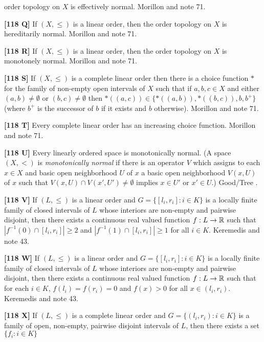 order topology on $X$ is effectively normal.  \ac{Morillon} \cite{1988}
and note 71.
\smallskip
\item{}{\bf [118 Q]} If $(X,\le)$ is a linear order, then the order
topology on $X$ is hereditarily normal.  \ac{Morillon} \cite{1988} and
note 71.
\smallskip
\item{}{\bf [118 R]} If $(X,\le)$ is a linear order, then the order
topology on $X$ is monotonely normal.  \ac{Morillon} \cite{1987} and
note 71.
\smallskip
\item{}{\bf [118 S]} If $(X,\le)$ is a complete linear order then there is
a choice function $*$ for the family of non-empty open intervals of $X$
such that if $a,b,c\in X$ and either $(a,b)\ne \emptyset$ or
$(b,c)\ne \emptyset$ then $*((a,c)) \in \{ *((a,b)), *((b,c)), b,b^+\}$
(where $b^+$ is the successor of $b$ if it exists and $b$
otherwise).  \ac{Morillon} \cite{1987} and note 71.
\smallskip
\item{}{\bf [118 T]} Every complete linear order has an increasing choice
function.  \ac{Morillon} \cite{1987} and note 71.
\smallskip
\item{}{\bf [118 U]} Every linearly ordered space is monotonically normal.
(A space $(X,<)$ is {\it monotonically normal} if there is an operator
$V$ which assigns to each $x\in X$ and basic open neighborhood $U$ of $x$
a basic open neighborhood $V(x,U)$ of $x$ such that $V(x,U)\cap V(x',U')
\ne\emptyset$ implies $x\in U'$ or $x'\in U$.) \ac{Good/Tree} \cite{1995}.
\smallskip
\item{}{\bf [118 V]} If $(L,\le)$ is a linear order and $G=\{[l_i,r_i]:
i\in K\}$ is a locally finite family of closed intervals of $L$ whose
interiors are non-empty and pairwise disjoint, then there exists a
continuous real valued function $f: L\to \Bbb R$ such that $|f^{-1}(0)
\cap[l_i,r_i]|\ge 2$ and $|f^{-1}(1)\cap[l_i,r_i]|\ge 1$ for all $i\in K$.
\ac{Keremedis} \cite{1997} and note 43.
\smallskip
\item{}{\bf [118 W]} If $(L,\le)$ is a linear order and $G=\{[l_i,r_i]:
i\in K\}$ is a locally finite family of closed intervals of $L$ whose
interiors are non-empty and pairwise disjoint, then there exists a
continuous real valued function $f: L\to \Bbb R$ such that for each
$i\in K$, $f(l_i) = f(r_i) = 0$ and $f(x) > 0$ for all $x\in (l_i, r_i)$.
\ac{Keremedis} \cite{1997} and note 43.
\smallskip
\item{}{\bf [118 X]} If $(L,\le)$ is a complete linear order and $G=
\{(l_i,r_i): i\in K\}$ is a family of open, non-empty, pairwise
disjoint intervals of $L$, then there exists a set $\{f_i: i\in K\}$
